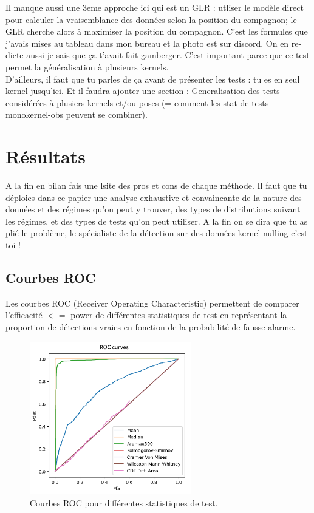 \documentclass{article}
\newcommand{\dm}[1]{{\color{mulberry} #1}}
\begin{document}
\dm{Il manque aussi une 3eme approche  ici qui est un GLR : utliser le modèle direct pour calculer la vraisemblance des données selon la position du compagnon; le GLR cherche alors à maximiser la position du compagnon. C'est les formules que j'avais mises au tableau dans mon bureau et la photo est sur discord. On en re-dicte aussi je sais que ça t'avait fait gamberger. C'est important parce que ce test permet la généralisation à plusieurs kernels. \\
D'ailleurs, il faut que tu parles de ça avant de présenter les tests : tu es en seul kernel jusqu'ici. Et il faudra ajouter  une section : Generalisation des tests considérées à plusiers kernels et/ou poses (= comment les stat de tests monokernel-obs peuvent se combiner).}
\section{Résultats}

\dm{A la fin en bilan fais une lsite des pros et cons de chaque méthode. Il faut que tu déploies dans ce papier une analyse exhaustive et convaincante de la nature des données et des régimes qu'on peut y trouver, des types de distributions suivant les régimes, et des types de tests qu'on peut utiliser. A la fin on se dira que tu as plié le problème, le spécialiste de la détection sur des données kernel-nulling c'est toi !  }
\subsection{Courbes ROC}

Les courbes ROC (Receiver Operating Characteristic) permettent de comparer l'efficacité \dm{$<=$ power } de différentes statistiques de test en représentant la proportion de détections vraies en fonction de la probabilité de fausse alarme.

\begin{figure}[H]
\centering
\includegraphics[width=7cm]{img/roc_curves.png}
\caption{Courbes ROC pour différentes statistiques de test.}
\label{fig:roc}
\end{figure}
\end{document}

